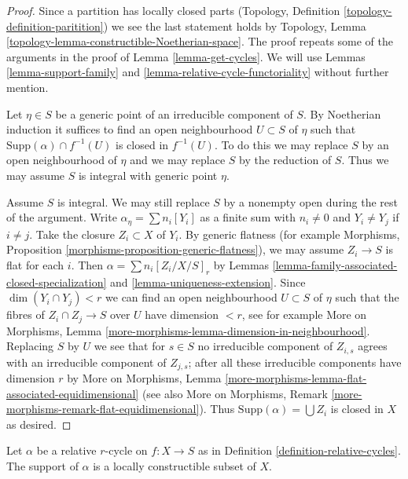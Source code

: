 \begin{proof}
Since a partition has locally closed parts
(Topology, Definition \ref{topology-definition-paritition})
we see the last statement holds by
Topology, Lemma \ref{topology-lemma-constructible-Noetherian-space}.
The proof repeats some of the arguments in the proof of
Lemma \ref{lemma-get-cycles}. We will use
Lemmas \ref{lemma-support-family} and
\ref{lemma-relative-cycle-functoriality}
without further mention.

\medskip\noindent
Let $\eta \in S$ be a generic point of an irreducible component of $S$.
By Noetherian induction it suffices to find an open neighbourhood
$U \subset S$ of $\eta$ such that $\text{Supp}(\alpha) \cap f^{-1}(U)$
is closed in $f^{-1}(U)$. To do this we may replace $S$ by an open
neighbourhood of $\eta$ and we may replace $S$ by the reduction of $S$.
Thus we may assume $S$ is integral with generic point $\eta$.

\medskip\noindent
Assume $S$ is integral. We may still replace $S$ by a nonempty open
during the rest of the argument. Write
$\alpha_\eta = \sum n_i[Y_i]$ as a finite sum with $n_i \not = 0$
and $Y_i \not = Y_j$ if $i \not = j$. Take the closure $Z_i \subset X$
of $Y_i$. By generic flatness (for example Morphisms,
Proposition \ref{morphisms-proposition-generic-flatness}),
we may assume $Z_i \to S$ is flat for each $i$.
Then $\alpha = \sum n_i[Z_i/X/S]_r$ by
Lemmas \ref{lemma-family-associated-closed-specialization} and
\ref{lemma-uniqueness-extension}.
Since $\dim(Y_i \cap Y_j) < r$ we can find an open
neighbourhood $U \subset S$ of $\eta$ such that the fibres of
$Z_i \cap Z_j \to S$ over $U$ have dimension $< r$, see
for example More on Morphisms, Lemma
\ref{more-morphisms-lemma-dimension-in-neighbourhood}.
Replacing $S$ by $U$ we see
that for $s \in S$ no irreducible component of $Z_{i, s}$
agrees with an irreducible component of $Z_{j, s}$; after all
these irreducible components have dimension $r$ by
More on Morphisms, Lemma
\ref{more-morphisms-lemma-flat-associated-equidimensional}
(see also More on Morphisms, Remark
\ref{more-morphisms-remark-flat-equidimensional}).
Thus $\text{Supp}(\alpha) = \bigcup Z_i$ is closed in $X$ as desired.
\end{proof}

\begin{lemma}
\label{lemma-relative-cycle-support}
Let $\alpha$ be a relative $r$-cycle on $f : X \to S$ as in
Definition \ref{definition-relative-cycles}.
The support of $\alpha$ is a locally constructible subset of $X$.
\end{lemma}

